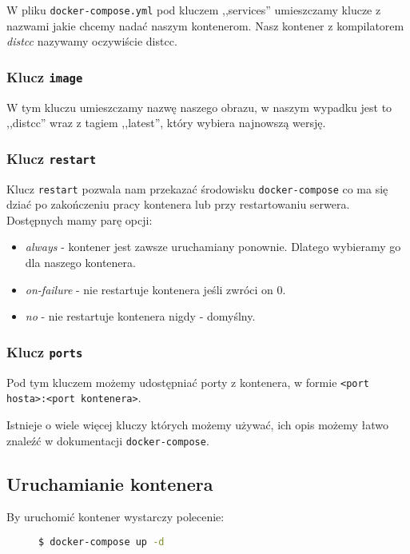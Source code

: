 \documentclass[a4paper,12pt]{article}
\begin{document}
W pliku \texttt{docker-compose.yml} pod kluczem ,,services'' umieszczamy klucze z nazwami jakie chcemy nadać naszym kontenerom. Nasz kontener z kompilatorem \emph{distcc} nazywamy oczywiście distcc.

\subsubsection{Klucz \texttt{image}}

W tym kluczu umieszczamy nazwę naszego obrazu, w naszym wypadku jest to ,,distcc'' wraz z tagiem ,,latest'', który wybiera najnowszą wersję.

\subsubsection{Klucz \texttt{restart}}

Klucz \texttt{restart} pozwala nam przekazać środowisku \texttt{docker-compose} co ma się dziać po zakończeniu pracy kontenera lub przy restartowaniu serwera. Dostępnych mamy parę opcji:
\begin{itemize}
    \item \emph{always} - kontener jest zawsze uruchamiany ponownie. Dlatego wybieramy go dla naszego kontenera.
    \item \emph{on-failure} - nie restartuje kontenera jeśli zwróci on 0.
    \item \emph{no} - nie restartuje kontenera nigdy - domyślny.
\end{itemize}

\subsubsection{Klucz \texttt{ports}}

Pod tym kluczem możemy udostępniać porty z kontenera, w formie \texttt{<port hosta>:<port kontenera>}.

\vspace{1cm}

Istnieje o wiele więcej kluczy których możemy używać, ich opis możemy łatwo znaleźć w dokumentacji \texttt{docker-compose}\cite{docker-compose:docs}.

\subsection*{Uruchamianie kontenera}

By uruchomić kontener wystarczy polecenie:

\begin{figure}[H]
    \begin{lstlisting}[frame=single,basicstyle=\footnotesize\ttfamily,language=bash,morekeywords={docker-compose}]
$ docker-compose up -d
    \end{lstlisting}
\end{figure}
\end{document}
